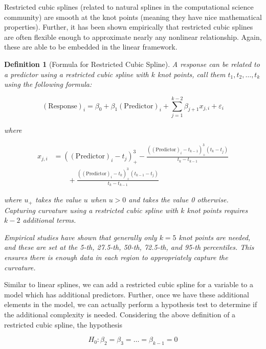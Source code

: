 \documentclass[
]{book}
\theoremstyle{plain}
\theoremstyle{mydefn}
\newtheorem{definition}{Definition}[chapter]
\theoremstyle{myexmpl}
\theoremstyle{remark}
\begin{document}
Restricted cubic splines (related to natural splines in the computational science community) are smooth at the knot points (meaning they have nice mathematical properties). Further, it has been shown empirically that restricted cubic splines are often flexible enough to approximate nearly any nonlinear relationship. Again, these are able to be embedded in the linear framework.

\begin{definition}[Formula for Restricted Cubic Spline]
\protect\hypertarget{def:defn-restricted-cubic-spline-formula}{}{\label{def:defn-restricted-cubic-spline-formula} {} }A response can be related to a predictor using a restricted cubic spline with \(k\) knot points, call them \(t_1, t_2, \dotsc, t_k\) using the following formula:

\[(\text{Response})_i = \beta_0 + \beta_1 (\text{Predictor})_i + \sum_{j=1}^{k-2} \beta_{j+1} x_{j,i} + \varepsilon_i\]

where

\[
\begin{aligned}
  x_{j,i} &= \left((\text{Predictor})_i - t_j\right)^3_{+} - \frac{\left((\text{Predictor})_i - t_{k-1}\right)^3_{+} \left(t_k - t_j\right)}{t_k - t_{k-1}} \\
    &\qquad +\frac{\left((\text{Predictor})_i - t_k\right)^3_{+} \left(t_{k-1} - t_j\right)}{t_k - t_{k-1}}
\end{aligned}
\]

where \(u_{+}\) takes the value \(u\) when \(u > 0\) and takes the value 0 otherwise. Capturing curvature using a restricted cubic spline with \(k\) knot points requires \(k-2\) additional terms.

Empirical studies have shown that generally only \(k = 5\) knot points are needed, and these are set at the 5-th, 27.5-th, 50-th, 72.5-th, and 95-th percentiles. This ensures there is enough data in each region to appropriately capture the curvature.
\end{definition}

Similar to linear splines, we can add a restricted cubic spline for a variable to a model which has additional predictors. Further, once we have these additional elements in the model, we can actually perform a hypothesis test to determine if the additional complexity is needed. Considering the above definition of a restricted cubic spline, the hypothesis

\[H_0: \beta_2 = \beta_3 = \dotsc = \beta_{k-1} = 0\]
\end{document}
